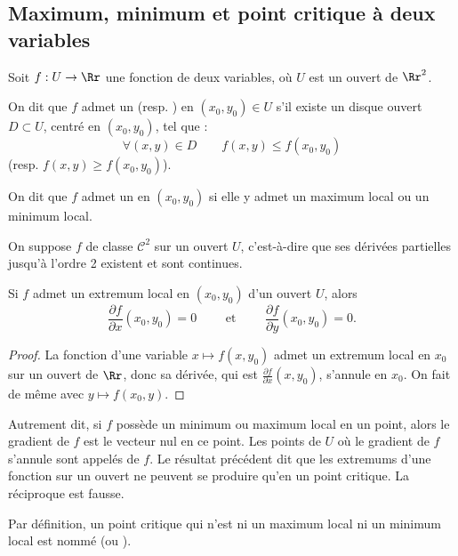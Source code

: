 
\subsection{Maximum, minimum et point critique à deux variables}
Soit $f:U\to \Rr$ une fonction de deux variables, o\`u $U$ est un ouvert de $\Rr^2$.

\begin{definition}{}{}
	On dit que $f$ admet un  (resp. ) en $(x_0,y_0)\in U$ s'il existe un disque ouvert $D\subset U$, centré en $(x_0,y_0)$, tel que :
    $$\forall (x,y)\in D \qquad f(x,y) \le f(x_0,y_0)$$
     (resp. $f(x,y) \ge f(x_0,y_0)$).

On dit que $f$ admet un  en $(x_0,y_0)$ si elle y admet un maximum local ou un minimum local.
\end{definition}




On suppose $f$ de classe $\mathcal{C}^2$ sur un ouvert $U$, c'est-à-dire que ses dérivées partielles jusqu'à l'ordre 2 existent et sont continues.


\begin{proposition}{}{}
	Si $f$ admet un extremum local en $(x_0,y_0)$ d'un ouvert $U$, alors $$\frac{\partial f}{\partial x}(x_0,y_0) = 0 \qquad \text{ et  } \qquad \frac{\partial f}{\partial y} (x_0,y_0) = 0.$$
\end{proposition}

\begin{proof}
    La fonction d'une variable $x\mapsto f(x,y_0)$ admet un extremum local en $x_0$ sur un ouvert de $\Rr$, donc sa dérivée, qui est $\frac{\partial f}{\partial x}  (x,y_0)$, s'annule en $x_0$. On fait de même avec $y\mapsto f(x_0,y)$.
\end{proof}

Autrement dit, si $f$ possède un minimum ou maximum local en un point, alors le gradient de $f$ est le vecteur nul en ce point.
Les points de $U$ où le gradient de $f$ s'annule sont appelés  de $f$. Le résultat précédent dit que les extremums d'une fonction sur un ouvert ne peuvent se produire qu'en un point critique. La réciproque est fausse.

Par définition, un point critique qui n'est ni un maximum local ni un minimum local est nommé  (ou ).

